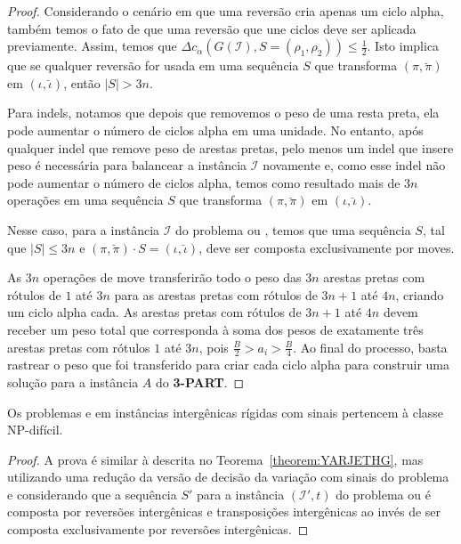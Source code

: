 \begin{proof}
Considerando o cenário em que uma reversão cria apenas um ciclo alpha, também temos o fato de que uma reversão que une ciclos deve ser aplicada previamente. Assim, temos que $\Delta c_{\alpha}(G(\mathcal{I}), S=(\rho_1,\rho_2)) \le \frac{1}{2}$. Isto implica que se qualquer reversão for usada em uma sequência $S$ que transforma $(\pi,\breve\pi)$ em $(\iota,\breve\iota)$, então $|S| > 3n$.

Para indels, notamos que depois que removemos o peso de uma resta preta, ela pode aumentar o número de ciclos alpha em uma unidade. No entanto, após qualquer indel que remove peso de arestas pretas, pelo menos um indel que insere peso é necessária para balancear a instância $\mathcal{I}$ novamente e, como esse indel não pode aumentar o número de ciclos alpha, temos como resultado mais de $3n$ operações em uma sequência $S$ que transforma $(\pi,\breve\pi)$ em $(\iota,\breve\iota)$. 

Nesse caso, para a instância $\mathcal{I}$ do problema \SbIRM{} ou \SbIRMI{}, temos que uma sequência $S$, tal que $|S| \le 3n$ e $(\pi,\breve\pi) \cdot S = (\iota,\breve\iota)$, deve ser composta exclusivamente por moves.

As $3n$ operações de move transferirão todo o peso das $3n$ arestas pretas com rótulos de $1$ até $3n$ para as arestas pretas com rótulos de $3n+1$ até $4n$, criando um ciclo alpha cada. As arestas pretas com rótulos de $3n+1$ até $4n$ devem receber um peso total que corresponda à soma dos pesos de exatamente três arestas pretas com rótulos $1$ até $3n$, pois $\frac{B}{2} > a_i > \frac{B}{4}$. Ao final do processo, basta rastrear o peso que foi transferido para criar cada ciclo alpha para construir uma solução para a instância $A$ do \textbf{3-PART}.
\end{proof}


\begin{theorem}\label{theorem:YACBNPHO}
Os problemas \SbIRTI{} e \SbIRTMI{} em instâncias intergênicas rígidas com sinais pertencem à classe NP-difícil.
\end{theorem}
\begin{proof}
A prova é similar à descrita no Teorema~\ref{theorem:YARJETHG}, mas utilizando uma redução da versão de decisão da variação com sinais do problema \SbRT{} e considerando que a sequência $S'$ para a instância $(\mathcal{I'},t)$ do problema \SbIRTI{} ou \SbIRTMI{} é composta por reversões intergênicas e transposições intergênicas ao invés de ser composta exclusivamente por reversões intergênicas.
\end{proof}

